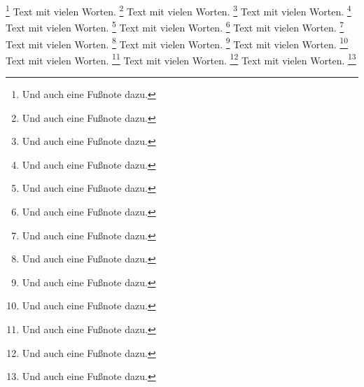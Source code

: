 \documentclass{article}
\begin{document}
\footnote{Und auch eine Fu\ss{}note dazu.}
Text mit vielen Worten.%
\footnote{Und auch eine Fu\ss{}note dazu.}
Text mit vielen Worten.%
\footnote{Und auch eine Fu\ss{}note dazu.}
Text mit vielen Worten.%
\footnote{Und auch eine Fu\ss{}note dazu.}
Text mit vielen Worten.%
\footnote{Und auch eine Fu\ss{}note dazu.}
Text mit vielen Worten.%
\footnote{Und auch eine Fu\ss{}note dazu.}
Text mit vielen Worten.%
\footnote{Und auch eine Fu\ss{}note dazu.}
Text mit vielen Worten.%
\footnote{Und auch eine Fu\ss{}note dazu.}
Text mit vielen Worten.%
\footnote{Und auch eine Fu\ss{}note dazu.}
Text mit vielen Worten.%
\footnote{Und auch eine Fu\ss{}note dazu.}
Text mit vielen Worten.%
\footnote{Und auch eine Fu\ss{}note dazu.}
Text mit vielen Worten.%
\footnote{Und auch eine Fu\ss{}note dazu.}
Text mit vielen Worten.%
\footnote{Und auch eine Fu\ss{}note dazu.}
\end{document}
